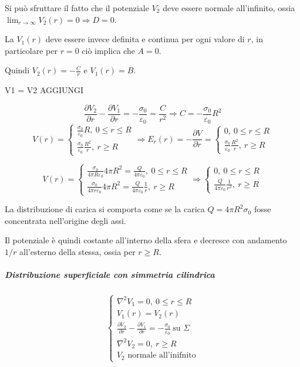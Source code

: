 
Si può sfruttare il fatto che il potenziale $V_2$ deve essere normale all'infinito, ossia
$\lim_{r\to\infty} V_2(r) = 0 \Rightarrow D = 0$.

La $V_1(r)$ deve essere invece definita e continua per ogni valore di $r$, in particolare per $r=0$
ciò implica che $A=0$.

Quindi $V_2(r) = -\frac{C}{r}$ e $V_1(r) = B$.

V1 = V2 AGGIUNGI

$$
\frac{\partial V_2}{\partial r} - \frac{\partial V_1}{\partial r} = -\frac{\sigma_0}{\varepsilon_0} =
\frac{C}{r^2} \Rightarrow C = -\frac{\sigma_0}{\varepsilon_0}R^2
$$
$$
V(r) = \begin{cases}
\frac{\sigma_0}{\varepsilon_0}R,\ 0\leq r \leq R \\
\frac{\sigma_0}{\varepsilon_0}\frac{R^2}{r},\ r\geq R
\end{cases}\Rightarrow
E_r(r) = -\frac{\partial V}{\partial r} =
\begin{cases}
0,\ 0\leq r \leq R \\
\frac{\sigma_0}{\varepsilon_0}\frac{R^2}{r},\ r\geq R
\end{cases}
$$


$$
V(r) = \begin{cases}
\frac{\sigma_0}{4\pi R \varepsilon_0}4\pi R^2 = \frac{Q}{4\pi\varepsilon_0},\ 0\leq r \leq R \\
\frac{\sigma_0}{4\pi r \varepsilon_0}4\pi R^2 = \frac{Q}{4\pi\varepsilon_0}\frac{1}{r},\ r\geq R
\end{cases}
\Rightarrow \begin{cases}
0,\ 0\leq r \leq R \\
\frac{Q}{4\pi\varepsilon_0}\frac{1}{r^2},\ r\geq R
\end{cases}
$$

La distribuzione di carica si comporta come se la carica $Q = 4 \pi R^2 \sigma_0$ fosse concentrata
nell'origine degli assi.

Il potenziale è quindi costante all'interno della sfera e decresce con andamento $1/r$ all'esterno
della stessa, ossia per $r \geq R$.

\subparagraph{Distribuzione superficiale con simmetria cilindrica}
$$
\begin{cases}
\nabla^2 V_1 = 0,\ 0\leq r\leq R\\
V_1(r) = V_2(r)\\
\frac{\partial V_2}{\partial r} - \frac{\partial V_1}{\partial r} = -\frac{\sigma_0}{\varepsilon_0}\ \text{su } \Sigma\\
\nabla^2 V_2 = 0,\ r\geq R\\
V_2 \text{ normale all'inifnito}
\end{cases}
$$

